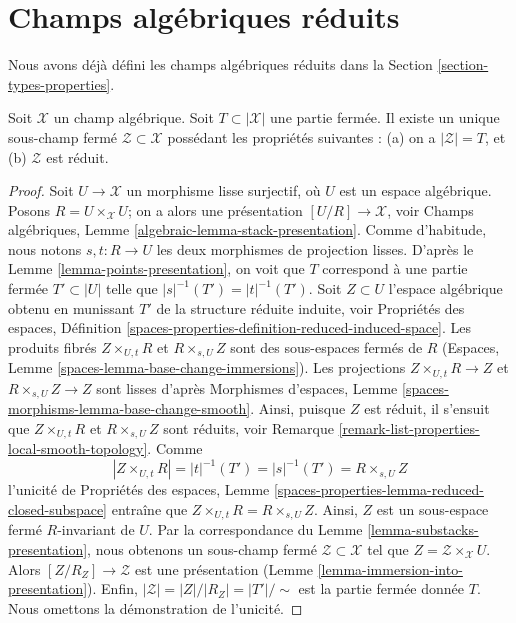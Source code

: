 \section{Champs algébriques réduits}
\label{section-reduced}

\noindent
Nous avons déjà défini les champs algébriques réduits dans la
Section \ref{section-types-properties}.

\begin{lemma}
\label{lemma-reduced-closed-substack}
Soit $\mathcal{X}$ un champ algébrique.
Soit $T \subset |\mathcal{X}|$ une partie fermée.
Il existe un unique sous-champ fermé $\mathcal{Z} \subset \mathcal{X}$
possédant les propriétés suivantes :
(a) on a $|\mathcal{Z}| = T$, et (b) $\mathcal{Z}$ est réduit.
\end{lemma}

\begin{proof}
Soit $U \to \mathcal{X}$ un morphisme lisse surjectif, où $U$ est un
espace algébrique. Posons $R = U \times_\mathcal{X} U$; on a alors une
présentation $[U/R] \to \mathcal{X}$, voir
Champs algébriques, Lemme \ref{algebraic-lemma-stack-presentation}.
Comme d'habitude, nous notons $s, t : R \to U$ les deux morphismes de projection lisses.
D'après le Lemme \ref{lemma-points-presentation},
on voit que $T$ correspond à une partie fermée $T' \subset |U|$ telle
que $|s|^{-1}(T') = |t|^{-1}(T')$.
Soit $Z \subset U$ l'espace algébrique obtenu en munissant
$T'$ de la structure réduite induite, voir
Propriétés des espaces,
Définition \ref{spaces-properties-definition-reduced-induced-space}.
Les produits fibrés
$Z \times_{U, t} R$ et $R \times_{s, U} Z$ sont des sous-espaces fermés
de $R$
(Espaces, Lemme \ref{spaces-lemma-base-change-immersions}).
Les projections $Z \times_{U, t} R \to Z$ et
$R \times_{s, U} Z \to Z$ sont lisses d'après
Morphismes d'espaces, Lemme \ref{spaces-morphisms-lemma-base-change-smooth}.
Ainsi, puisque $Z$ est réduit, il s'ensuit que
$Z \times_{U, t} R$ et $R \times_{s, U} Z$ sont réduits, voir
Remarque \ref{remark-list-properties-local-smooth-topology}.
Comme
$$
|Z \times_{U, t} R| = |t|^{-1}(T') = |s|^{-1}(T') = R \times_{s, U} Z
$$
l'unicité de
Propriétés des espaces,
Lemme \ref{spaces-properties-lemma-reduced-closed-subspace}
entraîne que $Z \times_{U, t} R = R \times_{s, U} Z$.
Ainsi, $Z$ est un sous-espace fermé $R$-invariant de $U$.
Par la correspondance du
Lemme \ref{lemma-substacks-presentation},
nous obtenons un sous-champ fermé $\mathcal{Z} \subset \mathcal{X}$
tel que $Z = \mathcal{Z} \times_\mathcal{X} U$. Alors
$[Z/R_Z] \to \mathcal{Z}$ est une présentation
(Lemme \ref{lemma-immersion-into-presentation}).
Enfin, $|\mathcal{Z}| = |Z|/|R_Z| = |T'|/\sim$ est la
partie fermée donnée $T$. Nous omettons la démonstration de l'unicité.
\end{proof}

